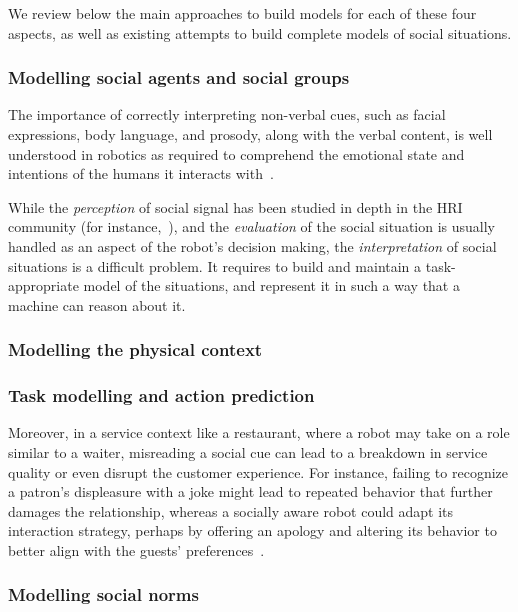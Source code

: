 We review below the main approaches to build models for each of these four
aspects, as well as existing attempts to build complete models of social situations.


\subsubsection{Modelling social agents and social groups}



The importance of correctly interpreting non-verbal cues, such as facial
expressions, body language, and prosody, along with the verbal content, is well
understood in robotics as required to comprehend the emotional state and
intentions of the humans it interacts with~\cite{breazeal2003emotion}.

While the \emph{perception} of social signal has been studied in depth in the
HRI community (for instance,~\cite{pantic2011social}), and the \emph{evaluation} of
the social situation is usually handled as an aspect of the robot's decision
making, the \emph{interpretation} of social situations is a difficult problem.
It requires to build and maintain a task-appropriate model of the situations,
and represent it in such a way that a machine can reason about it.


\subsubsection{Modelling the physical context}

\subsubsection{Task modelling and action prediction}



Moreover, in a service context like a restaurant, where a robot may take on a
role similar to a waiter, misreading a social cue can lead to a breakdown in
service quality or even disrupt the customer experience. For instance, failing
to recognize a patron's displeasure with a joke might lead to repeated behavior
that further damages the relationship, whereas a socially aware robot could
adapt its interaction strategy, perhaps by offering an apology and altering its
behavior to better align with the guests' preferences~\cite{mutlu2006storytelling}.

\subsubsection{Modelling social norms}

